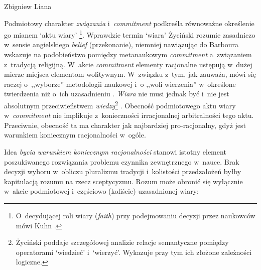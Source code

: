 \begin{artplenv}{Zbigniew Liana}


Podmiotowy charakter \textit{związania} i~\textit{commitment} podkreśla równoważne określenie go mianem ‘aktu wiary'
\parencite[][s.~186]{zycinski_teizm_1985}%
\footnote{O~decydującej roli wiary (\textit{faith}) przy podejmowaniu decyzji przez naukowców mówi Kuhn 
\parencites*[][s.~158]{kuhn_structure_1970_liana}[zob.][s.~274]{kuhn_struktura_2001}.%
}. Wprawdzie termin ‘wiara' Życiński rozumie zasadniczo w~sensie angielskiego \textit{belief} (przekonanie), niemniej nawiązując do Barboura 
\parencite*[][]{barbour_mity_1984} %
 wskazuje na podobieństwo pomiędzy metanaukowym \textit{commitment} a~związaniem z~tradycją religijną. W~akcie \textit{commitment} elementy racjonalne ustępują w~dużej mierze miejsca elementom wolitywnym. W~związku z~tym, jak zauważa, mówi się raczej o~,,wyborze'' metodologii naukowej i~o ,,woli wierzenia'' w~określone twierdzenia niż o~ich uzasadnieniu 
\parencite[][s.~164]{zycinski_teizm_1985}. %
 \textit{Wiara} nie musi jednak być i~nie jest absolutnym przeciwieństwem \textit{wiedzy}\footnote{Życiński 
\parencite*[][s.~141–156]{zycinski_teizm_1985} %
 poddaje szczegółowej analizie relacje semantyczne pomiędzy operatorami ‘wiedzieć' i~‘wierzyć'. Wykazuje przy tym ich złożone zależności logiczne.} . Obecność podmiotowego aktu wiary w~\textit{commitment} nie implikuje z~konieczności irracjonalnej arbitralności tego aktu. Przeciwnie, obecność ta ma charakter jak najbardziej pro-racjonalny, gdyż jest warunkiem koniecznym racjonalności w~ogóle.

Idea \textit{bycia warunkiem koniecznym racjonalności} stanowi istotny element poszukiwanego rozwiązania problemu czynnika zewnętrznego w~nauce. Brak decyzji wyboru w~obliczu pluralizmu tradycji i~kolistości przedzałożeń byłby kapitulacją rozumu na rzecz sceptycyzmu. Rozum może obronić się wyłącznie w~akcie podmiotowej i~częściowo (koliście) uzasadnionej wiary:


\end{artplenv}
